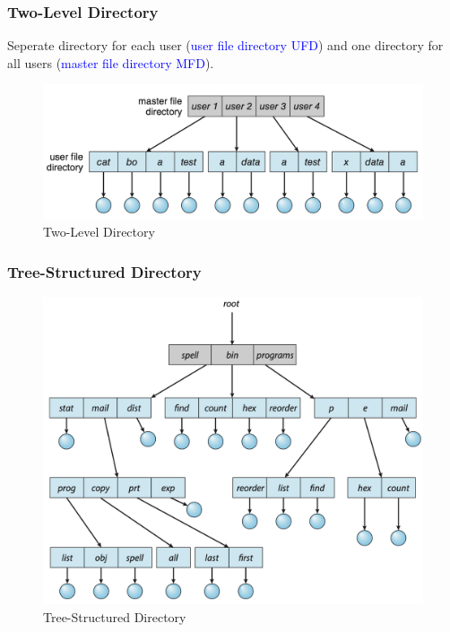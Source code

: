 \documentclass{book/custombook}
\begin{document}
                    \subsubsection{Two-Level Directory}
                        Seperate directory for each user (\textcolor{blue}{user file directory UFD}) and one directory for all users
                        (\textcolor{blue}{master file directory MFD}).\\
                        \begin{figure}[H]
                            \centering
                            \includegraphics[width=0.6\linewidth]{figures/two_level_dir.png}
                            \caption{Two-Level Directory}
                        \end{figure}
                    \subsubsection{Tree-Structured Directory}
                        \begin{figure}[H]
                            \centering
                            \includegraphics[width=0.6\linewidth]{figures/tree_dir.png}
                            \caption{Tree-Structured Directory}
                        \end{figure}
\end{document}
